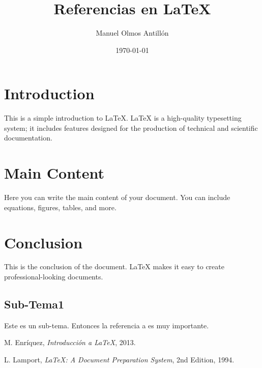 \documentclass{article}
\begin{document}
\title{Referencias en \LaTeX}
\author{Manuel Olmos Antillón}
\date{\today}

\maketitle

\section{Introduction}
This is a simple introduction to LaTeX. LaTeX is a high-quality typesetting system; it includes features designed for the production of technical and scientific documentation.

\section{Main Content}
Here you can write the main content of your document. You can include equations, figures, tables, and more.

\section{Conclusion}
This is the conclusion of the document. LaTeX makes it easy to create professional-looking documents.

\subsection{Sub-Tema1}
Este es un sub-tema. Entonces la referencia a \cite{Enr13} es muy importante.

\begin{thebibliography}{99} %

M. Enríquez, \textit{Introducción a \LaTeX}, 2013.

L. Lamport, \textit{\LaTeX: A Document Preparation System}, 2nd Edition, 1994.

\end{thebibliography}
\end{document}
